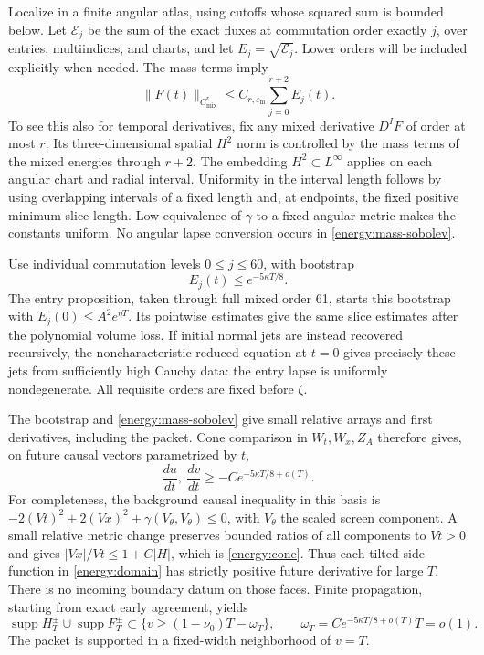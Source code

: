 Localize in a finite angular atlas, using cutoffs whose squared sum is
bounded below. Let \(\mathcal E_j\) be the sum of the exact fluxes
at commutation order exactly \(j\), over entries, multiindices, and
charts, and let \(E_j=\sqrt{\mathcal E_j}\). Lower orders will be
included explicitly when needed. The mass terms imply
\begin{equation}\label{energy:mass-sobolev}
 \lVert F(t)\rVert_{C^r_{\mathrm{mix}}}
       \le C_{r,\varepsilon_{\mathrm m}}\sum_{j=0}^{r+2}E_j(t).
\end{equation}
To see this also for temporal derivatives, fix any mixed derivative
\(D^IF\) of order at most \(r\). Its three-dimensional spatial
\(H^2\) norm is controlled by the mass terms of the mixed energies
through \(r+2\). The embedding \(H^2\subset L^\infty\) applies
on each angular chart and radial interval. Uniformity in the interval
length follows by using overlapping intervals of a fixed length and,
at endpoints, the fixed positive minimum slice length. Low equivalence
of \(\gamma\) to a fixed angular metric makes the constants uniform.
No angular lapse conversion occurs in \eqref{energy:mass-sobolev}.

Use individual commutation levels \(0\le j\le60\), with bootstrap
\begin{equation}\label{energy:bootstrap}
 E_j(t)\le e^{-5\kappa T/8}.
\end{equation}
The entry proposition, taken through full mixed order 61, starts this
bootstrap with \(E_j(0)\le A^2e^{\eta T}\). Its pointwise estimates
give the same slice estimates after the polynomial volume loss.
If initial normal jets are instead recovered recursively, the
noncharacteristic reduced equation at \(t=0\) gives precisely these
jets from sufficiently high Cauchy data: the entry lapse is uniformly
nondegenerate. All requisite orders are fixed before \(\zeta\).

The bootstrap and \eqref{energy:mass-sobolev} give small relative
arrays and first derivatives, including the packet. Cone comparison
in \(W_t,W_x,Z_A\) therefore gives, on future causal vectors
parametrized by \(t\),
\begin{equation}\label{energy:cone}
 \frac{du}{dt},\ \frac{dv}{dt}
             \ge-Ce^{-5\kappa T/8+o(T)}.
\end{equation}
For completeness, the background causal inequality in this basis is
\(-2(Vt)^2+2(Vx)^2+\gamma(V_\theta,V_\theta)\le0\), with
\(V_\theta\) the scaled screen component. A small relative metric
change preserves bounded ratios of all components to \(Vt>0\) and
gives \(|Vx|/Vt\le1+C|H|\), which is
\eqref{energy:cone}. Thus each tilted side function in
\eqref{energy:domain} has strictly positive future derivative for
large \(T\). There is no incoming boundary datum on those faces.
Finite propagation, starting from exact early agreement, yields
\begin{equation}\label{energy:known-support}
 \operatorname{supp}H_T^\pm\cup\operatorname{supp}F_T^\pm
       \subset\{v\ge(1-\nu_0)T-\omega_T\},\qquad
 \omega_T=Ce^{-5\kappa T/8+o(T)}T=o(1).
\end{equation}
The packet is supported in a fixed-width neighborhood of \(v=T\).

